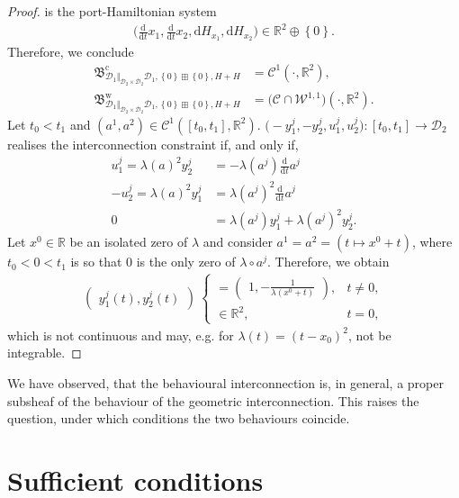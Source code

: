 \documentclass[preprint,12pt]{elsarticle}
\theoremstyle{definition}
\newcommand{\set}[1]{\left\lbrace #1\right\rbrace}
\begin{document}
\begin{proof}
is the port-Hamiltonian system
\begin{align*}
\big(\tfrac{\mathrm{d}}{\mathrm{d}t}x_1,\tfrac{\mathrm{d}}{\mathrm{d}t}x_2,\mathrm{d}H_{x_1},\mathrm{d}H_{x_2}\big)\in \mathbb{R}^2\oplus\set{0}.
\end{align*}
Therefore, we conclude
\begin{align*}
\mathfrak{B}^{\mathrm{c}}_{\mathcal{D}_1\Vert_{\mathcal{D}_2\times\mathcal{D}_2}\mathcal{D}_1,\set{0}\boxplus\set{0},H+H} & = \mathcal{C}^1(\cdot,\mathbb{R}^2),\\
\mathfrak{B}^{\mathrm{w}}_{\mathcal{D}_1\Vert_{\mathcal{D}_2\times\mathcal{D}_2}\mathcal{D}_1,\set{0}\boxplus\set{0},H+H} & = \big(\mathcal{C}\cap\mathcal{W}^{1,1}\big)(\cdot,\mathbb{R}^2).
\end{align*}
Let $t_0<t_1$ and $(a^1,a^2)\in\mathcal{C}^1([t_0,t_1],\mathbb{R}^2)$. $\big(-y_1^j,-y_2^j,u_1^j,u_2^j\big):[t_0,t_1]\to\mathcal{D}_2$ realises the interconnection constraint if, and only if,
\begin{align*}
u_1^j = \lambda(a)^2y_2^j & = -\lambda(a^j)\tfrac{\mathrm{d}}{\mathrm{d}t}a^j\\
-u_2^j = \lambda(a)^2y_1^j & = \lambda(a^j)^2\tfrac{\mathrm{d}}{\mathrm{d}t}a^j\\
0 & = \lambda(a^j)y_1^j+\lambda(a^j)^2y_2^j.
\end{align*}
Let $x^0\in\mathbb{R}$ be an isolated zero of $\lambda$ and consider $a^1 = a^2 = (t\mapsto x^0+t)$, where $t_0<0<t_1$ is so that $0$ is the only zero of $\lambda\circ a^j$. Therefore, we obtain
\begin{align*}
\begin{pmatrix}
y_1^j(t), y_2^j(t)
\end{pmatrix}\ \begin{cases} = \begin{pmatrix}
1, -\frac{1}{\lambda(x^0+t)}
\end{pmatrix}, & t \neq 0,\\
\in\mathbb{R}^2, & t = 0,
\end{cases}
\end{align*}
which is not continuous and may, e.g. for $\lambda(t)=(t-x_0)^2$, not be integrable.
\end{proof}

We have observed, that the behavioural interconnection is, in general, a proper subsheaf of the behaviour of the geometric interconnection. This raises the question, under which conditions the two behaviours coincide.

\section{Sufficient conditions}\label{sec:sufficient_conditions}
\end{document}
